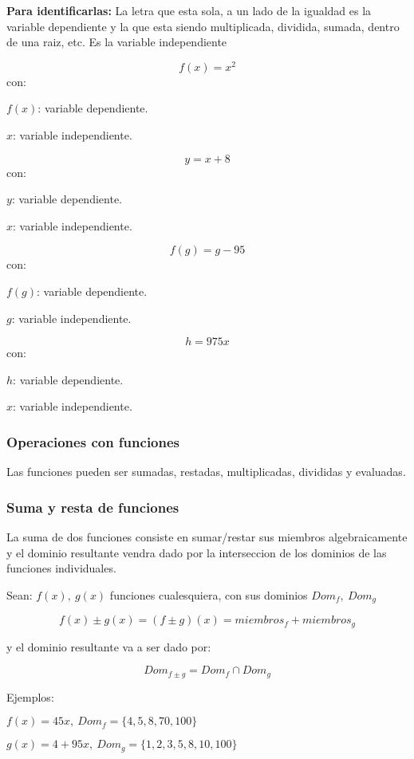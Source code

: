     \textbf{Para identificarlas:} La letra que esta sola, a un lado de la
    igualdad es la variable dependiente y la que esta siendo multiplicada, dividida,
    sumada, dentro de una raiz, etc. Es la variable independiente

    $$ f(x) = x^2 $$
    con:

    $ f(x) $: variable dependiente.

    $x$: variable independiente.

    $$ y = x+8 $$
    con:

    $ y $: variable dependiente.

    $x$: variable independiente.

    $$ f(g) = g-95 $$
    con:

    $ f(g) $: variable dependiente.

    $g$: variable independiente.

    $$ h = 975x $$
        con:

    $ h$: variable dependiente.

    $x$: variable independiente.

\subsubsection*{Operaciones con funciones} \label{Operaciones_con_funciones}

    Las funciones pueden ser sumadas, restadas, multiplicadas, divididas
    y evaluadas.


\subsubsection*{Suma y resta de funciones} \label{Suma_de_funciones}

La suma de dos funciones consiste en sumar/restar sus miembros algebraicamente y el
dominio resultante vendra dado por la interseccion de los dominios de las
funciones individuales.

Sean: $ f(x),\ g(x) $ funciones cualesquiera, con sus dominios $ Dom_f,\ Dom_g $

    $$ f(x)\pm g(x)=(f\pm g)(x)= miembros_f + miembros_g $$

y el dominio resultante va a ser dado por:


    $$ Dom_{f\pm g}= Dom_f \cap Dom_g $$


    Ejemplos:

    $ f(x)= 45x,\ Dom_f=\{4,5,8,70,100\} $

    $ g(x)=4 +95x,\ Dom_g= \{1,2,3,5,8,10,100\}$
\\

